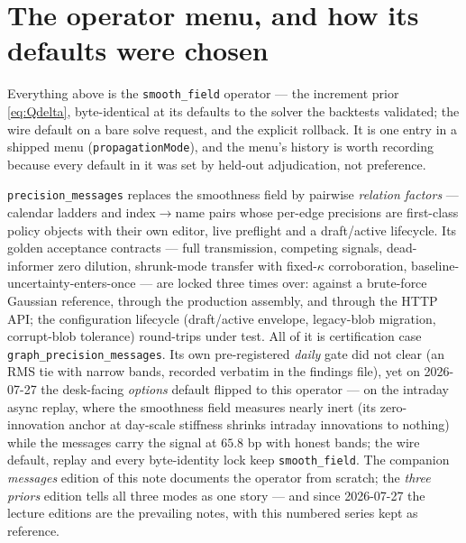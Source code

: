 \documentclass[11pt]{article}
\begin{document}
\section{The operator menu, and how its defaults were chosen}
\label{sec:menu}

Everything above is the \texttt{smooth\_field} operator ---
the increment prior \eqref{eq:Qdelta}, byte-identical
at its defaults to the solver the backtests validated; the wire default on
a bare solve request, and the explicit rollback. It is one entry in a
shipped menu (\texttt{propagationMode}), and the menu's history is worth
recording because every default in it was set by held-out adjudication, not
preference.

\texttt{precision\_messages} replaces the smoothness field by pairwise
\emph{relation factors} --- calendar ladders and index$\to$name pairs whose
per-edge precisions are first-class policy objects with their own editor,
live preflight and a draft/active lifecycle. Its golden acceptance contracts
--- full transmission, competing signals, dead-informer zero dilution,
shrunk-mode transfer with fixed-$\kappa$ corroboration,
baseline-uncertainty-enters-once --- are locked three times over: against a
brute-force Gaussian reference, through the production assembly, and through
the HTTP API; the configuration lifecycle (draft/active envelope, legacy-blob
migration, corrupt-blob tolerance) round-trips under test. All of it is
certification case \texttt{graph\_precision\_messages}.  Its own
pre-registered \emph{daily} gate did not clear (an RMS tie with narrow
bands, recorded verbatim in the findings file), yet on 2026-07-27 the
desk-facing \emph{options} default flipped to this operator --- on the
intraday async replay, where the smoothness field measures nearly inert
(its zero-innovation anchor at day-scale stiffness shrinks intraday
innovations to nothing) while the messages carry the signal at $65.8$ bp
with honest bands; the wire default, replay and every byte-identity lock
keep \texttt{smooth\_field}.  The companion
\emph{messages} edition of this note documents the operator from scratch;
the \emph{three priors} edition tells all three modes as one story ---
and since 2026-07-27 the lecture editions are the prevailing notes, with
this numbered series kept as reference.
\end{document}
